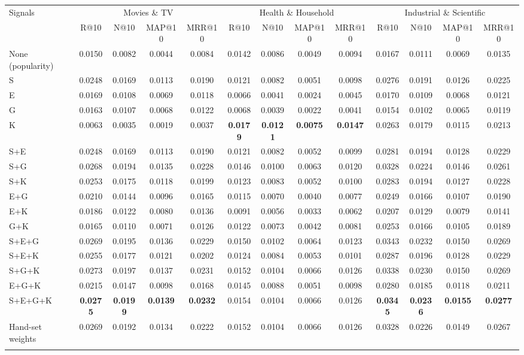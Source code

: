 \setlength{\tabcolsep}{3pt}
\begin{tabular*}{\hsize}{@{\extracolsep{\fill}}lcccccccccccc@{}}
\toprule
Signals & \multicolumn{4}{c}{Movies \& TV} & \multicolumn{4}{c}{Health \& Household} & \multicolumn{4}{c}{Industrial \& Scientific} \\
 & R@10 & N@10 & MAP@10 & MRR@10 & R@10 & N@10 & MAP@10 & MRR@10 & R@10 & N@10 & MAP@10 & MRR@10 \\
\colrule
None (popularity) & 0.0150 & 0.0082 & 0.0044 & 0.0084 & 0.0142 & 0.0086 & 0.0049 & 0.0094 & 0.0167 & 0.0111 & 0.0069 & 0.0135 \\
\colrule
S & 0.0248 & 0.0169 & 0.0113 & 0.0190 & 0.0121 & 0.0082 & 0.0051 & 0.0098 & 0.0276 & 0.0191 & 0.0126 & 0.0225 \\
E & 0.0169 & 0.0108 & 0.0069 & 0.0118 & 0.0066 & 0.0041 & 0.0024 & 0.0045 & 0.0170 & 0.0109 & 0.0068 & 0.0121 \\
G & 0.0163 & 0.0107 & 0.0068 & 0.0122 & 0.0068 & 0.0039 & 0.0022 & 0.0041 & 0.0154 & 0.0102 & 0.0065 & 0.0119 \\
K & 0.0063 & 0.0035 & 0.0019 & 0.0037 & \textbf{0.0179} & \textbf{0.0121} & \textbf{0.0075} & \textbf{0.0147} & 0.0263 & 0.0179 & 0.0115 & 0.0213 \\
\colrule
S+E & 0.0248 & 0.0169 & 0.0113 & 0.0190 & 0.0121 & 0.0082 & 0.0052 & 0.0099 & 0.0281 & 0.0194 & 0.0128 & 0.0229 \\
S+G & 0.0268 & 0.0194 & 0.0135 & 0.0228 & 0.0146 & 0.0100 & 0.0063 & 0.0120 & 0.0328 & 0.0224 & 0.0146 & 0.0261 \\
S+K & 0.0253 & 0.0175 & 0.0118 & 0.0199 & 0.0123 & 0.0083 & 0.0052 & 0.0100 & 0.0283 & 0.0194 & 0.0127 & 0.0228 \\
E+G & 0.0210 & 0.0144 & 0.0096 & 0.0165 & 0.0115 & 0.0070 & 0.0040 & 0.0077 & 0.0249 & 0.0166 & 0.0107 & 0.0190 \\
E+K & 0.0186 & 0.0122 & 0.0080 & 0.0136 & 0.0091 & 0.0056 & 0.0033 & 0.0062 & 0.0207 & 0.0129 & 0.0079 & 0.0141 \\
G+K & 0.0165 & 0.0110 & 0.0071 & 0.0126 & 0.0122 & 0.0073 & 0.0042 & 0.0081 & 0.0253 & 0.0166 & 0.0105 & 0.0189 \\
\colrule
S+E+G & 0.0269 & 0.0195 & 0.0136 & 0.0229 & 0.0150 & 0.0102 & 0.0064 & 0.0123 & 0.0343 & 0.0232 & 0.0150 & 0.0269 \\
S+E+K & 0.0255 & 0.0177 & 0.0121 & 0.0202 & 0.0124 & 0.0084 & 0.0053 & 0.0101 & 0.0287 & 0.0196 & 0.0128 & 0.0229 \\
S+G+K & 0.0273 & 0.0197 & 0.0137 & 0.0231 & 0.0152 & 0.0104 & 0.0066 & 0.0126 & 0.0338 & 0.0230 & 0.0150 & 0.0269 \\
E+G+K & 0.0215 & 0.0147 & 0.0098 & 0.0168 & 0.0145 & 0.0088 & 0.0051 & 0.0098 & 0.0280 & 0.0185 & 0.0118 & 0.0211 \\
\colrule
S+E+G+K & \textbf{0.0275} & \textbf{0.0199} & \textbf{0.0139} & \textbf{0.0232} & 0.0154 & 0.0104 & 0.0066 & 0.0126 & \textbf{0.0345} & \textbf{0.0236} & \textbf{0.0155} & \textbf{0.0277} \\
\colrule
Hand-set weights & 0.0269 & 0.0192 & 0.0134 & 0.0222 & 0.0152 & 0.0104 & 0.0066 & 0.0126 & 0.0328 & 0.0226 & 0.0149 & 0.0267 \\
\botrule
\end{tabular*}
